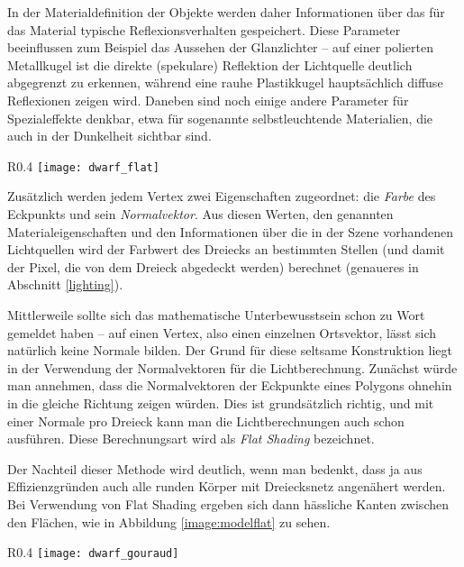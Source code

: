 In der Materialdefinition der Objekte werden daher Informationen über das für das Material typische Reflexionsverhalten gespeichert. Diese Parameter beeinflussen zum Beispiel das Aussehen der Glanzlichter -- auf einer polierten Metallkugel ist die direkte (spekulare) Reflektion der Lichtquelle deutlich abgegrenzt zu erkennen, während eine rauhe Plastikkugel hauptsächlich diffuse Reflexionen zeigen wird. Daneben sind noch einige andere Parameter für Spezialeffekte denkbar, etwa für sogenannte selbstleuchtende Materialien, die auch in der Dunkelheit sichtbar sind.

\begin{wrapfigure}{R}{0.4\textwidth}
  \texttt{[image: dwarf\_flat]}
  \vspace{-10pt}
  \caption{Flat Shading.}
  \label{image:modelflat}
\end{wrapfigure}

Zusätzlich werden jedem Vertex zwei Eigenschaften zugeordnet: die \emph{Farbe} des Eckpunkts und sein \emph{Normalvektor}. Aus diesen Werten, den genannten Materialeigenschaften und den Informationen über die in der Szene vorhandenen Lichtquellen wird der Farbwert des Dreiecks an bestimmten Stellen (und damit der Pixel, die von dem Dreieck abgedeckt werden) berechnet (genaueres in Abschnitt \ref{lighting}).

\label{vertexnormals}
Mittlerweile sollte sich das mathematische Unterbewusstsein schon zu Wort gemeldet haben -- auf einen Vertex, also einen 
einzelnen Ortsvektor, lässt sich natürlich keine Normale bilden. Der Grund für diese seltsame Konstruktion liegt in der Verwendung der Normalvektoren für die Lichtberechnung. Zunächst würde man annehmen, dass die Normalvektoren der Eckpunkte eines Polygons ohnehin in die gleiche Richtung zeigen würden. Dies ist grundsätzlich richtig, und mit einer Normale pro Dreieck kann man die Lichtberechnungen auch schon ausführen. Diese Berechnungsart wird als \emph{Flat Shading} bezeichnet.

Der Nachteil dieser Methode wird deutlich, wenn man bedenkt, dass ja aus Effizienzgründen auch alle runden Körper mit Dreiecksnetz angenähert werden. Bei Verwendung von Flat Shading ergeben sich dann hässliche Kanten zwischen den Flächen, wie in Abbildung \ref{image:modelflat} zu sehen.

\begin{wrapfigure}{R}{0.4\textwidth}
  \texttt{[image: dwarf\_gouraud]}
  \vspace{-10pt}
  \caption{Gouraud Shading.}
  \label{image:modelgouraud}	
\end{wrapfigure}

